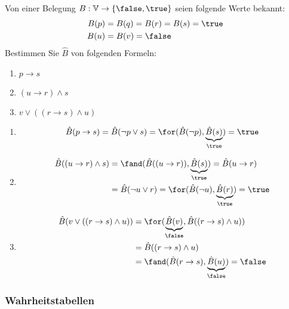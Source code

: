 \begin{example}
Von einer Belegung $B:\mathbb{V}\to \{\false,\true\}$ seien folgende Werte bekannt:
\begin{align*}
B(p) &= B(q) = B(r) = B(s) =\true\\
B(u) &= B(v) = \false
\end{align*}
Bestimmen Sie $\hat B$ von folgenden Formeln:
\begin{enumerate}
\item $p\to s$
\item $(u\to r)\land s$
\item $v\lor((r\to s)\land u)$
\end{enumerate}
\tcblower
\begin{enumerate}
\item
\[
\hat B(p\to s)=\hat B(\neg p\lor s)=\for(\hat B(\neg p),\underbrace{\hat
B(s)}_{\true})=\true
\]
\item
\begin{align*}
\hat B((u\to r)\land s)&=\fand (\hat B((u\to r)), \underbrace{\hat
B(s)}_{\true})=\hat B(u\to r)\\
&=\hat B(\neg u\lor r)=\for(\hat B(\neg u),\underbrace{\hat B(r)}_{\true})=\true
\end{align*}
\item
\begin{align*}
\hat B(v\lor((r\to s)\land u))
&=\for(\underbrace{\hat B(v)}_{\false},\hat B((r\to s)\land u))\\
&=\hat B((r\to s)\land u)\\
&=\fand(\hat B(r\to s),\underbrace{\hat B(u)}_{\false})=\false
\end{align*}
\end{enumerate}
\end{example}

\subsubsection{Wahrheitstabellen}

